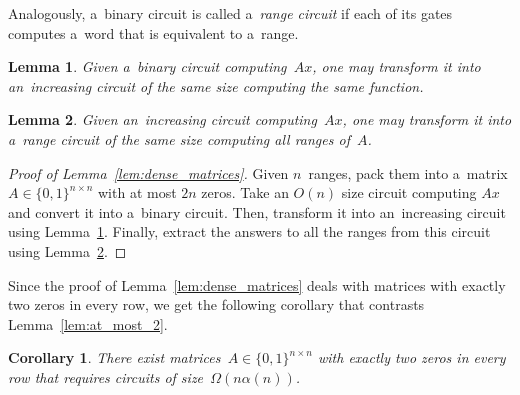 \documentclass[11pt,letterpaper]{article}
\newtheorem{lemma}{Lemma}
\newtheorem{corollary}{Corollary}
\begin{document}
Analogously, a~binary circuit is called a~{\em range circuit} if each of its gates computes a~word that is equivalent to a~range.

\begin{lemma}\label{lemma:correctorder}
Given a~binary circuit computing~$Ax$, one may transform it into an~increasing circuit of the same size computing the same function.
\end{lemma}

\begin{lemma}\label{lemma:matrixranges}
Given an~increasing circuit computing~$Ax$, one may transform it into a~range circuit of the same size computing all ranges of~$A$.
\end{lemma}

\begin{proof}[Proof of Lemma~\ref{lem:dense_matrices}]
Given $n$~ranges, pack them into a~matrix $A \in \{0,1\}^{n \times n}$ with at most $2n$ zeros. Take an $O(n)$ size circuit computing $Ax$ and convert it into a~binary circuit. Then, transform it into an~increasing circuit using Lemma~\ref{lemma:correctorder}. Finally, extract the answers to all the ranges from this circuit using Lemma~\ref{lemma:matrixranges}.
\end{proof}

Since the proof of Lemma~\ref{lem:dense_matrices} deals with matrices with exactly two zeros in every row, we get the following corollary that contrasts Lemma~\ref{lem:at_most_2}.
\begin{corollary}\label{cor:noncommutativetwo}
There exist matrices~$A \in \{0,1\}^{n \times n}$ with exactly two zeros in every row that requires circuits of size~$\Omega(n\alpha(n))$.
\end{corollary}
\end{document}
